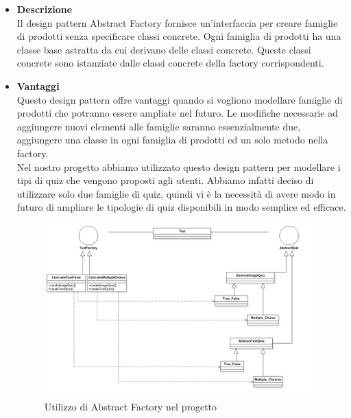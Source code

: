 		\begin{itemize}
			\item \textbf{Descrizione}\\ 
			Il design pattern Abstract Factory fornisce un'interfaccia per creare famiglie di prodotti senza specificare classi concrete. Ogni famiglia di prodotti ha una classe base astratta da cui derivano delle classi concrete. Queste classi concrete sono istanziate dalle classi concrete della factory corrispondenti.
			
			\item \textbf{Vantaggi}\\ 
			Questo design pattern offre vantaggi quando si vogliono modellare famiglie di prodotti che potranno essere ampliate nel futuro. Le modifiche necessarie ad aggiungere nuovi elementi alle famiglie saranno essenzialmente due, aggiungere una classe in ogni famiglia di prodotti ed un solo metodo nella factory.
			\utilizzo \\ 
			Nel nostro progetto abbiamo utilizzato questo design pattern per modellare i tipi di quiz che vengono proposti agli utenti. Abbiamo infatti deciso di utilizzare solo due famiglie di quiz, quindi vi è la necessità di avere modo in futuro di ampliare le tipologie di quiz disponibili in modo semplice ed efficace.
			
			\begin{figure}[!h]
				\centering
				\includegraphics[scale=0.4]{img/our_abstract_factory}  
				\caption{Utilizzo di Abstract Factory nel progetto}
			\end{figure}
			
		\end{itemize}
	 \newpage
	 
